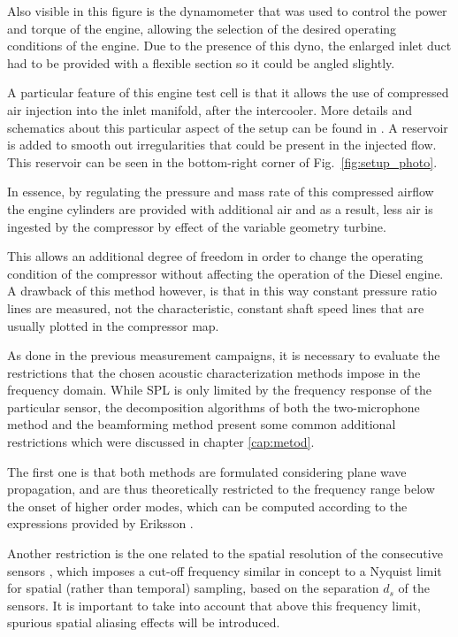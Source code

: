Also visible in this figure is the dynamometer that was used to control the power and torque of the engine, allowing the selection of the desired operating conditions of the engine. Due to the presence of this dyno, the enlarged inlet duct had to be provided with a flexible section so it could be angled slightly.

A particular feature of this engine test cell is that it allows the use of compressed air injection into the inlet manifold, after the intercooler. More details and schematics about this particular aspect of the setup can be found in \cite{galindo2013engine,galindo2011measurement}. A reservoir is added to smooth out irregularities that could be present in the injected flow. This reservoir can be seen in the bottom-right corner of Fig.~\ref{fig:setup_photo}.

In essence, by regulating the pressure and mass rate of this compressed airflow the engine cylinders are provided with additional air and as a result, less air is ingested by the compressor by effect of the variable geometry turbine.

This allows an additional degree of freedom in order to change the operating condition of the compressor without affecting the operation of the Diesel engine. A drawback of this method however, is that in this way constant pressure ratio lines are measured, not the characteristic, constant shaft speed lines that are usually plotted in the compressor map.

As done in the previous measurement campaigns, it is necessary to evaluate the restrictions that the chosen acoustic characterization methods impose in the frequency domain. While SPL is only limited by the frequency response of the particular sensor, the decomposition algorithms of both the two-microphone method and the beamforming method present some common additional restrictions which were discussed in chapter \ref{cap:metod}.

The first one is that both methods are formulated considering plane wave propagation, and are thus theoretically restricted to the frequency range below the onset of higher order modes, which can be computed according to the expressions provided by Eriksson \cite{eriksson1980higher}.

Another restriction is the one related to the spatial resolution of the consecutive sensors \cite{seybert1988two}, which imposes a cut-off frequency similar in concept to a Nyquist limit for spatial (rather than temporal) sampling, based on the separation $d_s$ of the sensors. It is important to take into account that above this frequency limit, spurious spatial aliasing effects will be introduced.

